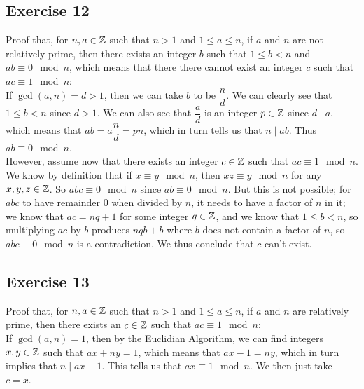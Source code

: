 \documentclass[12pt]{article}
\begin{document}
    \subsection*{Exercise 12}
    Proof that, for $n, a \in \mathbb{Z}$ such that $n > 1$
    and $1 \leqslant a \leqslant n$,
    if $a$ and $n$ are not relatively prime,
    then there exists an integer $b$ such that
    $1 \leqslant b < n$ and $ab \equiv 0 \mod n$,
    which means that there there cannot exist an integer $c$
    such that $ac \equiv 1 \mod n$: \\
    If $\gcd(a, n) = d > 1$,
    then we can take $b$ to be $\dfrac{n}{d}$.
    We can clearly see that $1 \leqslant b < n$
    since $d > 1$.
    We can also see that $\dfrac{a}{d}$ is an integer $p \in \mathbb{Z}$
    since $d \mid a$,
    which means that $ab = a\dfrac{n}{d} = pn$,
    which in turn tells us that $n \mid ab$.
    Thus $ab \equiv 0 \mod n$. \\
    However, assume now that there exists an integer $c \in \mathbb{Z}$
    such that $ac \equiv 1 \mod n$.
    We know by definition that if $x \equiv y \mod n$,
    then $xz \equiv y \mod n$ for any $x, y, z \in \mathbb{Z}$. 
    So $abc \equiv 0 \mod n$
    since $ab \equiv 0 \mod n$.
    But this is not possible;
    for $abc$ to have remainder $0$ when divided by $n$,
    it needs to have a factor of $n$ in it;
    we know that $ac = nq + 1$ for some integer $q \in \mathbb{Z}$,
    and we know that $1 \leqslant b < n$,
    so multiplying $ac$ by $b$
    produces $nqb + b$ where $b$ does not contain a factor of $n$,
    so $abc \equiv 0 \mod n$ is a contradiction.
    We thus conclude that $c$ can't exist. \\

    \subsection*{Exercise 13}
    Proof that, for $n, a \in \mathbb{Z}$ such that $n > 1$
    and $1 \leqslant a \leqslant n$,
    if $a$ and $n$ are relatively prime,
    then there exists an $c \in \mathbb{Z}$
    such that $ac \equiv 1 \mod n$: \\
    If $\gcd(a, n) = 1$,
    then by the Euclidian Algorithm, we can find integers $x, y \in \mathbb{Z}$
    such that $ax + ny = 1$,
    which means that $ax - 1 = ny$,
    which in turn implies that $n \mid ax - 1$.
    This tells us that $ax \equiv 1 \mod n$.
    We then just take $c = x$. \\
\end{document}
